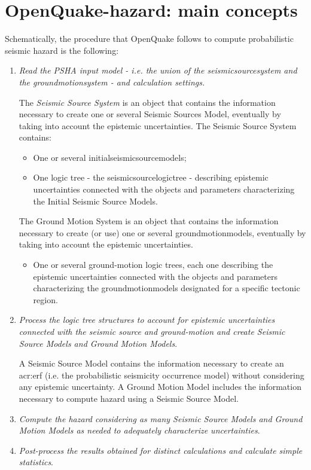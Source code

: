 \section{OpenQuake-hazard: main concepts}
Schematically, the procedure that OpenQuake follows to compute probabilistic 
seismic hazard is the following:
%
\begin{enumerate}
%
\item \emph{Read the PSHA input model - i.e. the union of the 
\gls{seismicsourcesystem} and the \gls{groundmotionsystem} - 
and calculation settings.}
	
	The \emph{Seismic Source System} is an object that contains the 
	information necessary to create one or several Seismic Sources Model, 
	eventually by taking into account the epistemic uncertainties. 
	The Seismic Source System contains:
	\begin{itemize}
	\item One or several \glspl{initialseismicsourcemodel};
	\item One logic tree - the \gls{seismicsourcelogictree} - describing 
	epistemic uncertainties connected with the objects and parameters 
	characterizing the Initial Seismic Source Models.
	\end{itemize}
	
	The Ground Motion System is an object that contains the information 
	necessary to create (or use) one or several \glspl{groundmotionmodel}, 
	eventually by taking into account the epistemic uncertainties. 
	\begin{itemize}
	\item One or several ground-motion logic trees, each one describing 
	the epistemic uncertainties connected with the objects and parameters 
	characterizing the \glspl{groundmotionmodel} designated for a specific 
	tectonic region.
	\end{itemize}

%
\item \emph{Process the logic tree structures to account for epistemic 
uncertainties connected with the seismic source and ground-motion and
create Seismic Source Models and Ground Motion Models}.
	
	A Seismic Source Model contains the information necessary to create an 
	\gls{acr:erf} (i.e. the probabilistic seismicity occurrence
	model) without con\-sid\-er\-ing any epistemic uncertainty.
	A Ground Motion Model includes the information 
	necessary to compute hazard using a Seismic Source Model. 
\item \emph{Compute the hazard considering as many Seismic Source Models and 
Ground Motion Models as needed to adequately characterize uncertainties}.
\item \emph{Post-process the results obtained for distinct calculations and
calculate simple statistics}.
\end{enumerate}
%

